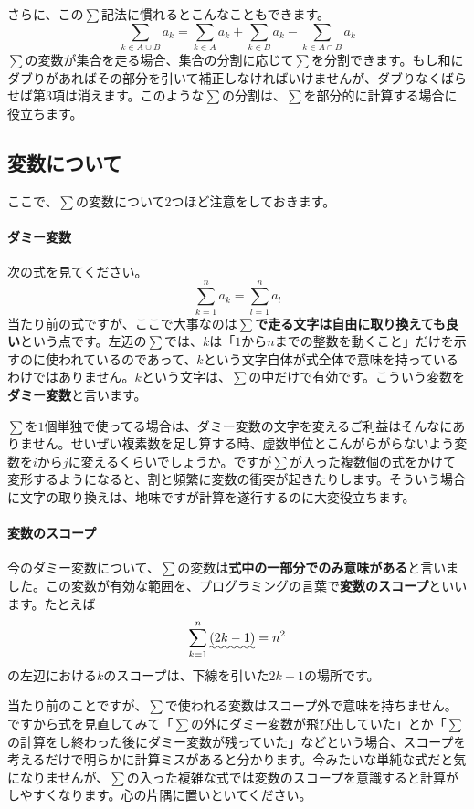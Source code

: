 さらに、この$\sum$記法に慣れるとこんなこともできます。
\[
\sum_{k \in A\cup B} a_k = \sum_{k \in A} a_k  + \sum_{k \in B} a_k - \sum_{k \in A\cap B} a_k
\]
$\sum$の変数が集合を走る場合、集合の分割に応じて$\sum$を分割できます。もし和にダブりがあればその部分を引いて補正しなければいけませんが、ダブりなくばらせば第$3$項は消えます。このような$\sum$の分割は、$\sum$を部分的に計算する場合に役立ちます。

\subsection{変数について}

ここで、$\sum$の変数について$2$つほど注意をしておきます。

\paragraph{ダミー変数}

次の式を見てください。
\[
\sum_{k = 1}^n a_k = \sum_{l = 1}^n a_l
\]
当たり前の式ですが、ここで大事なのは\textbf{$\sum$で走る文字は自由に取り換えても良い}という点です。左辺の$\sum$では、$k$は「$1$から$n$までの整数を動くこと」だけを示すのに使われているのであって、$k$という文字自体が式全体で意味を持っているわけではありません。$k$という文字は、$\sum$の中だけで有効です。こういう変数を\textbf{ダミー変数}と言います。

$\sum$を$1$個単独で使ってる場合は、ダミー変数の文字を変えるご利益はそんなにありません。せいぜい複素数を足し算する時、虚数単位とこんがらがらないよう変数を$i$から$j$に変えるくらいでしょうか。ですが$\sum$が入った複数個の式をかけて変形するようになると、割と頻繁に変数の衝突が起きたりします。そういう場合に文字の取り換えは、地味ですが計算を遂行するのに大変役立ちます。

\paragraph{変数のスコープ}

今のダミー変数について、$\sum$の変数は\textbf{式中の一部分でのみ意味がある}と言いました。この変数が有効な範囲を、プログラミングの言葉で\textbf{変数のスコープ}といいます。たとえば
\[
\sum_{k=1}^n \uwave{(2k - 1)} = n^2
\]
の左辺における$k$のスコープは、下線を引いた$2k-1$の場所です。

当たり前のことですが、$\sum$で使われる変数はスコープ外で意味を持ちません。ですから式を見直してみて「$\sum$の外にダミー変数が飛び出していた」とか「$\sum$の計算をし終わった後にダミー変数が残っていた」などという場合、スコープを考えるだけで明らかに計算ミスがあると分かります。今みたいな単純な式だと気になりませんが、$\sum$の入った複雑な式では変数のスコープを意識すると計算がしやすくなります。心の片隅に置いといてください。

